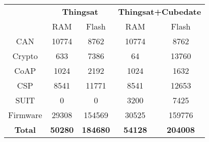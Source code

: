 \documentclass{standalone}
\begin{document}
\begin{tabular}{ccccc}
\hline
               & \multicolumn{2}{c}{\textbf{Thingsat}} & \multicolumn{2}{c}{\textbf{Thingsat+Cubedate}} \\
               & RAM               & Flash             & RAM               & Flash             \\ \hline
CAN            & 10774             & 8762              & 10774             & 8762              \\
Crypto         & 633               & 7386              & 64                & 13760             \\
CoAP           & 1024              & 2192              & 1024              & 1632              \\
CSP            & 8541              & 11771             & 8541              & 12653             \\
SUIT           & 0                 & 0                 & 3200              & 7425              \\
Firmware       & 29308             & 154569            & 30525             & 159776            \\ \hline
\textbf{Total} & \textbf{50280}    & \textbf{184680}   & \textbf{54128}    & \textbf{204008}   \\ \hline
\end{tabular}%
\end{document}
